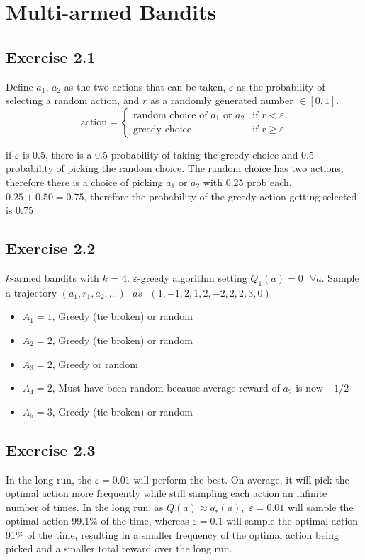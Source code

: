 \section{Multi-armed Bandits}


\subsection{Exercise 2.1}
Define $a_1$, $a_2$ as the two actions that can be taken, $\varepsilon$ as the probability of selecting a random action, and $r$ as a randomly generated number $\in [0,1]$. 
\begin{equation}
    \text{action} = 
    \begin{cases}
        \text{random choice of $a_1$ or $a_2$} & \text{if } r < \varepsilon \\
        \text{greedy choice} & \text{if } r \geq \varepsilon
        \end{cases}
\end{equation}

if $\varepsilon$ is 0.5, there is a 0.5 probability of taking the greedy choice and 0.5 probability of picking the random choice. The random choice has two actions, therefore there is a choice of picking $a_1$ or $a_2$ with 0.25 prob each. $0.25 + 0.50 = 0.75$, therefore the probability of the greedy action getting selected is 0.75

\subsection{Exercise 2.2}
$k$-armed bandits with $k$ = 4. $\varepsilon$-greedy algorithm setting $Q_1(a) = 0 \text{ }\forall a$.
Sample a trajectory $(a_1,r_1,a_2,\dots) \text{ } as \text{ } (1,-1, 2,1, 2,-2,2,2,3,0)$

\begin{itemize}
  \item $A_1 = 1$, Greedy (tie broken) or random
  \item $A_2 = 2$, Greedy (tie broken) or random
  \item $A_3 = 2$, Greedy or random
  \item $A_4 = 2$, Must have been random because average reward of $a_2$ is now $-1/2$
  \item $A_5 = 3$, Greedy (tie broken) or random
\end{itemize}

\subsection{Exercise 2.3}
In the long run, the $\varepsilon = 0.01$ will perform the best. On average, it will pick the optimal action more frequently while still sampling each action an infinite number of times. In the long run, as $Q(a) \approx q_*(a), $ $\varepsilon= 0.01$ will sample the optimal action 99.1\% of the time,  whereas $\varepsilon = 0.1$ will sample the optimal action 91\% of the time, resulting in a smaller frequency of the optimal action being picked and a smaller total reward over the long run. 

